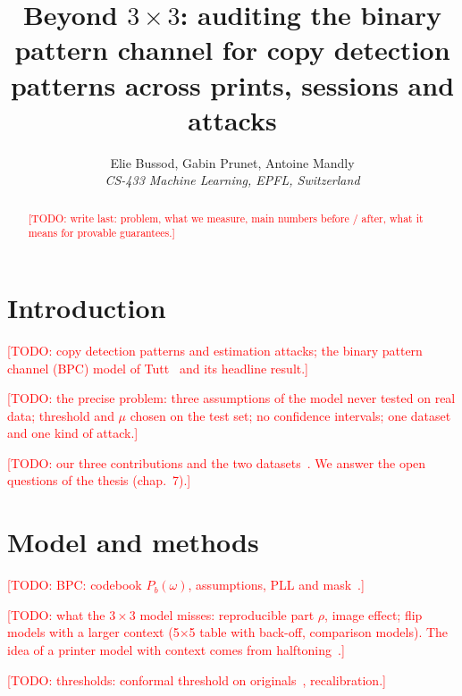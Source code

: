 \documentclass[10pt,conference,compsocconf]{IEEEtran}
\newcommand{\todo}[1]{\textcolor{red}{[TODO: #1]}}
\begin{document}
\title{Beyond \texorpdfstring{$3\times3$}{3x3}: auditing the binary pattern channel for copy detection patterns across prints, sessions and attacks}

\author{
  Elie Bussod, Gabin Prunet, Antoine Mandly\\
  \textit{CS-433 Machine Learning, EPFL, Switzerland}
}

\maketitle

\begin{abstract}
  \todo{write last: problem, what we measure, main numbers before / after, what it means for provable guarantees.}
\end{abstract}

\section{Introduction}
\todo{copy detection patterns and estimation attacks; the binary pattern channel (BPC) model of Tutt~\cite{tutt2025thesis} and its headline result.}

\todo{the precise problem: three assumptions of the model never tested on real data; threshold and $\mu$ chosen on the test set; no confidence intervals; one dataset and one kind of attack.}

\todo{our three contributions and the two datasets~\cite{chaban2022variability,khermaza2021scantrust}. We answer the open questions of the thesis (chap.~7).}

\section{Model and methods}
\label{sec:methods}
\todo{BPC: codebook $P_b(\omega)$, assumptions, PLL and mask~\cite{tutt2024tifs,tutt2024provable}.}

\todo{what the $3\times3$ model misses: reproducible part $\rho$, image effect; flip models with a larger context (5$\times$5 table with back-off, comparison models). The idea of a printer model with context comes from halftoning~\cite{pappas1995printer}.}

\todo{thresholds: conformal threshold on originals~\cite{bates2023conformal}, recalibration.}
\end{document}
